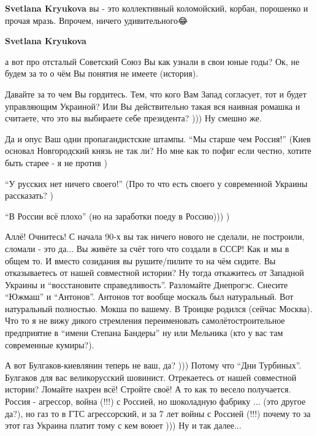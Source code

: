 \begin{itemize}
\begin{itemize}
 
\textbf{Svetlana Kryukova} вы - это коллективный коломойский, корбан, порошенко и прочая мразь. Впрочем, ничего удивительного😂

 
\textbf{Svetlana Kryukova} 

а вот про отсталый Советский Союз Вы как узнали в свои юные годы? Ок, не будем
за то о чём Вы понятия не имеете (история).

Давайте за то чем Вы гордитесь. Тем, что кого Вам Запад согласует, тот и будет
управляющим Украиной? Или Вы действительно такая вся наивная ромашка и
считаете, что это вы выбираете себе президента? ))) Ну смешно же.

Да и опус Ваш одни пропагандистские штампы. \enquote{Мы старше чем Россия!} (Киев
основал Новгородский князь не так ли? Но мне как то пофиг если честно, хотите
быть старее - я не против \Smiley[1.0][yellow])

\enquote{У русских нет ничего своего!} (Про то что есть своего у современной Украины
рассказать? \Smiley[1.0][yellow])

\enquote{В России всё плохо} (но на заработки поеду в Россию))) \Smiley[1.0][yellow] )

Аллё! Очнитесь! С начала 90-х вы так ничего нового не сделали, не построили,
сломали - это да... Вы живёте за счёт того что создали в СССР! Как и мы в общем
то. И вместо созидания вы рушите/пилите то на чём сидите. Вы отказываетесь от
нашей совместной истории? Ну тогда откажитесь от Западной Украины и
\enquote{восстановите справедливость}. Разломайте Днепрогэс. Снесите \enquote{Южмаш} и
\enquote{Антонов}. Антонов тот вообще москаль был натуральный. Вот натуральный
полностью. Мокша по вашему. В Троицке родился (сейчас Москва). Что то я не вижу
дикого стремления переименовать самолётостроительное предприятие в \enquote{имени
Степана Бандеры} ну или Мельника (кто у вас там современные кумиры?). 

А вот Булгаков-киевлянин теперь не ваш, да? ))) Потому что \enquote{Дни Турбиных}.
Булгаков для вас великорусский шовинист. Отрекаетесь от нашей совместной
истории? Ломайте нахрен всё! Стройте своё! А то как то весело получается.
Россия - агрессор, война (!!!) с Россией, но шоколадную фабрику ... (это другое
да?), но газ то в ГТС агрессорский, и за 7 лет войны с Россией (!!!) почему то
за этот газ Украина платит тому с кем воюет ))) Ну и так далее...


\end{itemize}
\end{itemize}
